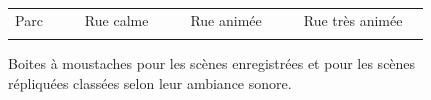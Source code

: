 \begin{figure}[ht]
\centering
{}

\begin{tabular}{|p{1.5cm}|l|p{0.001cm}|p{2cm}|l|p{0.001cm}|p{2cm}|l|p{0.001cm}|p{2.75cm}|l|}
\hhline{|-|-|~|-|-|~|-|-|~|-|-|}
Parc & {\cellcolor[HTML]{5AB25A}} & & Rue calme & {\cellcolor[HTML]{FFCB2F}} & & Rue animée & {\cellcolor[HTML]{F56B00}} & &  Rue très animée & {\cellcolor[HTML]{9A0000}}\\
\hhline{|-|-|~|-|-|~|-|-|~|-|-|}
\end{tabular}

\caption{Boites à moustaches pour les scènes enregistrées   et pour les scènes répliquées  classées selon leur ambiance sonore.}
\label{fig:boxplot_scene}
\end{figure}

